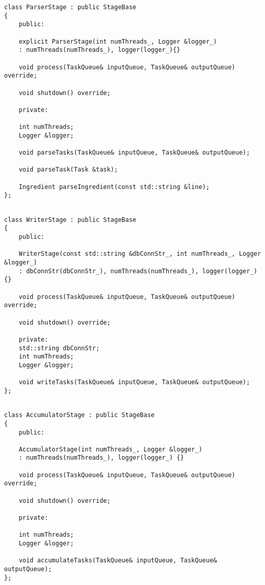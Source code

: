 \begin{center}
	\captionsetup{justification=raggedright,singlelinecheck=off}
	\begin{lstlisting}[caption={Интерфейс класса ParserStage}, label={lst:ParserStage}]
class ParserStage : public StageBase
{
	public:
	
	explicit ParserStage(int numThreads_, Logger &logger_)
	: numThreads(numThreads_), logger(logger_){}
	
	void process(TaskQueue& inputQueue, TaskQueue& outputQueue) override;
	
	void shutdown() override;
	
	private:
	
	int numThreads;
	Logger &logger;
	
	void parseTasks(TaskQueue& inputQueue, TaskQueue& outputQueue);
	
	void parseTask(Task &task);
	
	Ingredient parseIngredient(const std::string &line);
};
	\end{lstlisting}
\end{center}

\begin{center}
	\captionsetup{justification=raggedright,singlelinecheck=off}
	\begin{lstlisting}[caption={Интерфейс класса WriterStage}, label={lst:WriterStage}]

class WriterStage : public StageBase
{
	public:
	
	WriterStage(const std::string &dbConnStr_, int numThreads_, Logger &logger_)
	: dbConnStr(dbConnStr_), numThreads(numThreads_), logger(logger_) {}
	
	void process(TaskQueue& inputQueue, TaskQueue& outputQueue) override;
	
	void shutdown() override;
	
	private:
	std::string dbConnStr;
	int numThreads;
	Logger &logger;
	
	void writeTasks(TaskQueue& inputQueue, TaskQueue& outputQueue);
};
	\end{lstlisting}
\end{center}

\begin{center}
	\captionsetup{justification=raggedright,singlelinecheck=off}
	\begin{lstlisting}[caption={Интерфейс класса TaskAccumulatorStage}, label={lst:TaskAccumulatorStage}]

class AccumulatorStage : public StageBase
{
	public:
	
	AccumulatorStage(int numThreads_, Logger &logger_)
	: numThreads(numThreads_), logger(logger_) {}
	
	void process(TaskQueue& inputQueue, TaskQueue& outputQueue) override;
	
	void shutdown() override;
	
	private:
	
	int numThreads;
	Logger &logger;
	
	void accumulateTasks(TaskQueue& inputQueue, TaskQueue& outputQueue);
};
	\end{lstlisting}
\end{center}

